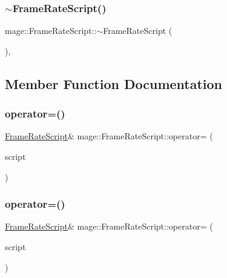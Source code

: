 \subsubsection{\texorpdfstring{$\sim$\+Frame\+Rate\+Script()}{~FrameRateScript()}}
{\footnotesize\ttfamily mage\+::\+Frame\+Rate\+Script\+::$\sim$\+Frame\+Rate\+Script (\begin{DoxyParamCaption}{ }\end{DoxyParamCaption})\hspace{0.3cm}{\ttfamily [virtual]}, {\ttfamily [default]}}



\subsection{Member Function Documentation}
\hypertarget{classmage_1_1_frame_rate_script_a2077ec2facadcde117a20d18e2f0e9b7}{}\label{classmage_1_1_frame_rate_script_a2077ec2facadcde117a20d18e2f0e9b7} 
\subsubsection{\texorpdfstring{operator=()}{operator=()}\hspace{0.1cm}{\footnotesize\ttfamily [1/2]}}
{\footnotesize\ttfamily \hyperlink{classmage_1_1_frame_rate_script}{Frame\+Rate\+Script}\& mage\+::\+Frame\+Rate\+Script\+::operator= (\begin{DoxyParamCaption}\item[{const \hyperlink{classmage_1_1_frame_rate_script}{Frame\+Rate\+Script} \&}]{script }\end{DoxyParamCaption})\hspace{0.3cm}{\ttfamily [delete]}}

\hypertarget{classmage_1_1_frame_rate_script_a828664f89350ac0da2da3da26c05a6f0}{}\label{classmage_1_1_frame_rate_script_a828664f89350ac0da2da3da26c05a6f0} 
\subsubsection{\texorpdfstring{operator=()}{operator=()}\hspace{0.1cm}{\footnotesize\ttfamily [2/2]}}
{\footnotesize\ttfamily \hyperlink{classmage_1_1_frame_rate_script}{Frame\+Rate\+Script}\& mage\+::\+Frame\+Rate\+Script\+::operator= (\begin{DoxyParamCaption}\item[{\hyperlink{classmage_1_1_frame_rate_script}{Frame\+Rate\+Script} \&\&}]{script }\end{DoxyParamCaption})\hspace{0.3cm}{\ttfamily [delete]}}

